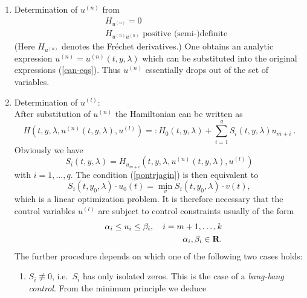 \documentclass[12pt,a4paper]{article}
\newcommand{\R}{\mbox{{\sf\bf R}}}
\begin{document}
\begin{enumerate}
  \item Determination of $u^{(n)}$ from
  \begin{eqnarray}
    && H_{u^{(n)}} = 0 \nonumber \\
    && H_{u^{(n)}u^{(n)}} \mbox{ positive (semi-)definite} \label{sys-nonlin}
  \end{eqnarray}
  (Here $H_{u^{(n)}}$ denotes the Fr\'echet derivatives.)  One obtains
  an analytic expression $u^{(n)} = u^{(n)}(t,y,\lambda)$ which can be
  substituted into the original expressions (\ref{can-eqs}). Thus
  $u^{(n)}$ essentially drops out of the set of variables.
  \item Determination of $u^{(l)}$:\\
        After substitution of $u^{(n)}$ the Hamiltonian can be written as
        \begin{equation}
          H(t,y,\lambda,u^{(n)}(t,y,\lambda),u^{(l)})
            =: H_{0}(t,y,\lambda)
            +  \sum_{i=1}^{q} S_{i}(t,y,\lambda) u_{m+i}\:.
        \end{equation}
        Obviously we have
        \begin{equation}
          S_{i}(t,y,\lambda) = H_{u_{m+i}}(t,y,\lambda,u^{(n)}(t,y,\lambda),u^{(l)})
        \end{equation}
        with $i=1,\ldots,q$. 
        The condition (\ref{pontrjagin}) is then equivalent to
        \begin{equation}
          S_{i}(t,y_{0},\lambda) \cdot u_{0}(t) = \min_{v} S_{i}(t,y_{0},\lambda) \cdot v(t),
        \end{equation}
      which is a linear optimization problem. 
      It is therefore necessary that the control variables $u^{(l)}$ are subject to
      control constraints usually of the form
        \begin{eqnarray}
          && \alpha_{i} \leq u_{i} \leq \beta_{i}, \quad i=m+1,\dots,k
          \nonumber \\
          && \alpha_{i}, \beta_{i} \in \R.
        \end{eqnarray}
      The further procedure
      depends on which one of the following two cases holds:
        \begin{enumerate}
          \item $S_{i} \not\equiv 0$, i.e.\ $S_{i}$ has only isolated zeros.
               This is the case of a {\em bang-bang control}.
               From the minimum principle we deduce
                 \begin{equation}

\end{equation}
\end{enumerate}
\end{enumerate}
\end{document}
